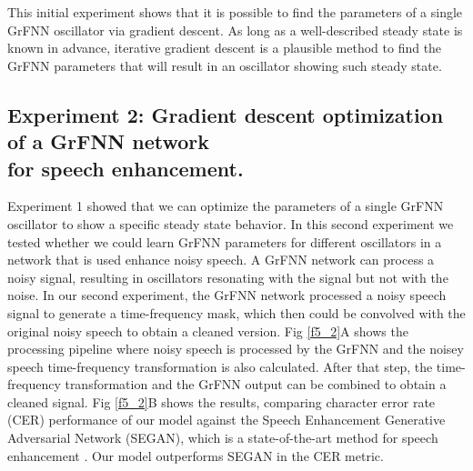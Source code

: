 \documentclass{report}
\begin{document}
This initial experiment shows that it is possible to find the parameters of a single GrFNN oscillator via gradient descent. As long as a well-described steady state is known in advance, iterative gradient descent is a plausible method to find the GrFNN parameters that will result in an oscillator showing such steady state.

\subsection{Experiment 2: Gradient descent optimization of a GrFNN network \\ for speech enhancement.} 

Experiment 1 showed that we can optimize the parameters of a single GrFNN oscillator to show a specific steady state behavior. In this second experiment we tested whether we could learn GrFNN parameters for different oscillators in a network that is used enhance noisy speech. A GrFNN network can process a noisy signal, resulting in oscillators resonating with the signal but not with the noise. In our second experiment, the GrFNN network processed a noisy speech signal to generate a time-frequency mask, which then could be convolved with the original noisy speech to obtain a cleaned version. Fig \ref{f5_2}A shows the processing pipeline where noisy speech is processed by the GrFNN and the noisey speech time-frequency transformation is also calculated. After that step, the time-frequency transformation and the GrFNN output can be combined to obtain a cleaned signal. Fig \ref{f5_2}B shows the results, comparing character error rate (CER) performance of our model against the Speech Enhancement Generative Adversarial Network (SEGAN), which is a state-of-the-art method for speech enhancement \cite{pascual2017segan}. Our model outperforms SEGAN in the CER metric. 
\end{document}
